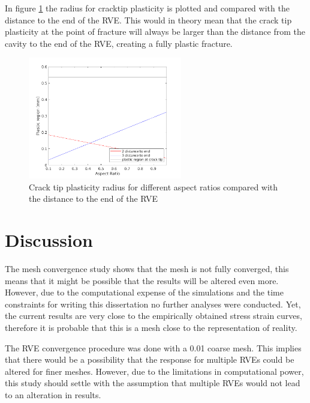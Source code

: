 In figure \ref{fig:cracktip} the radius for cracktip plasticity is plotted and compared with the distance to the end of the RVE. This would in theory mean that the crack tip plasticity at the point of fracture will always be larger than the distance from the cavity to the end of the RVE, creating a fully plastic fracture.  
\begin{figure}[H]
    \centering
    \includegraphics[width=0.60\textwidth]{chapter_7_non-elasticmodelling/figures/cracktip.png}
    \caption{Crack tip plasticity radius for different aspect ratios compared with the distance to the end of the RVE}
    \label{fig:cracktip}
\end{figure}


\section{Discussion}
The mesh convergence study shows that the mesh is not fully converged, this means that it might be possible that the results will be altered even more. However, due to the computational expense of the simulations and the time constraints for writing this dissertation no further analyses were conducted. Yet, the current results are very close to the empirically obtained stress strain curves, therefore it is probable that this is a mesh close to the representation of reality. 

The RVE convergence procedure was done with a 0.01 coarse mesh. This implies that there would be a possibility that the response for multiple RVEs could be altered for finer meshes. However, due to the limitations in computational power, this study should settle with the assumption that multiple RVEs would not lead to an alteration in results.  


